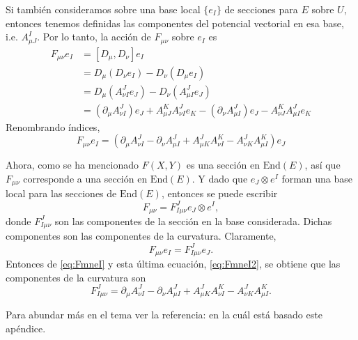 Si tambi\'{e}n consideramos sobre una base local $\{e_{I}\}$ de secciones para $E$ sobre $U$, entonces tenemos definidas las componentes del potencial vectorial en esa base, i.e. $A^{I}_{\mu J}$. Por lo tanto, la acci\'{o}n de $F_{\mu \nu}$ sobre $e_{I}$ es
%
\begin{align*}
F_{\mu \nu} e_{I} & = [D_{\mu}, D_{\nu}] e_{I} \\
& = D_{\mu} (D_{\nu} e_{I}) - D_{\nu} (D_{\mu} e_{I}) \\
& = D_{\mu} (A^{J}_{\nu I} e_{J}) - D_{\nu} (A^{J}_{\mu I} e_{J}) \\
& = (\partial_{\mu} A^{J}_{\nu I}) e_{J} + A^{K}_{\mu J} A^{J}_{\nu I} e_{K} - (\partial_{\nu} A^{J}_{\mu I}) e_{J} - A^{K}_{\nu J} A^{J}_{\mu I} e_{K}
\end{align*}
%
Renombrando \'{i}ndices,
%
\begin{equation}
\label{eq:FmneI}
F_{\mu \nu} e_{I} = (\partial_{\mu} A^{J}_{\nu I} - \partial_{\nu} A^{J}_{\mu I} + A^{J}_{\mu K} A^{K}_{\nu I} - A^{J}_{\nu K} A^{K}_{\mu I}) e_{J}
\end{equation}

Ahora, como se ha mencionado $F(X,Y)$ es una secci\'{o}n en $\mathrm{End}(E)$, as\'{i} que $F_{\mu \nu}$ corresponde a una secci\'{o}n en $\mathrm{End}(E)$. Y dado que $e_{J} \otimes e^{I}$ forman una base local para las secciones de $\mathrm{End}(E)$, entonces se puede escribir
%
\begin{equation}
F_{\mu \nu} = F^{J}_{I \mu \nu} e_{J} \otimes e^{I},
\end{equation}
%
donde $F^{J}_{I \mu \nu}$ son las componentes de la secci\'{o}n en la base considerada. Dichas componentes son las componentes de la curvatura. Claramente,
%
\begin{equation}
\label{eq:FmneI2}
F_{\mu \nu} e_{I} = F^{J}_{I \mu \nu} e_{J}.
\end{equation}
%
Entonces de \eqref{eq:FmneI} y esta \'{u}ltima ecuaci\'{o}n, \eqref{eq:FmneI2}, se obtiene que las componentes de la curvatura son
%
\begin{equation}
F^{J}_{I \mu \nu} = \partial_{\mu} A^{J}_{\nu I} - \partial_{\nu} A^{J}_{\mu I} + A^{J}_{\mu K} A^{K}_{\nu I} - A^{J}_{\nu K} A^{K}_{\mu I}.
\end{equation}

Para abundar m\'{a}s en el tema ver la referencia:  \cite{Baez} en la cuál está basado este ap\'{e}ndice.